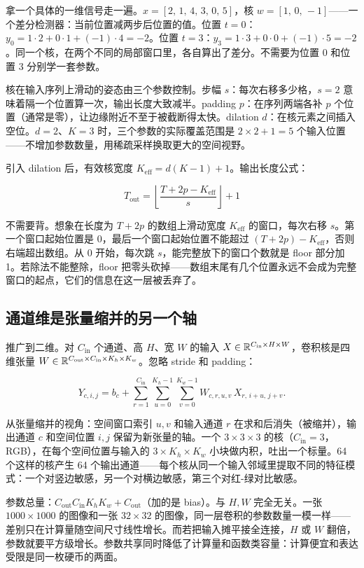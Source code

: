 拿一个具体的一维信号走一遍。\(x = [2,\,1,\,4,\,3,\,0,\,5]\)，核 \(w = [1,\,0,\,-1]\)——一个差分检测器：当前位置减两步后位置的值。位置 \(t=0\)：\(y_0 = 1\cdot 2 + 0\cdot 1 + (-1)\cdot 4 = -2\)。位置 \(t=3\)：\(y_3 = 1\cdot 3 + 0\cdot 0 + (-1)\cdot 5 = -2\)。同一个核，在两个不同的局部窗口里，各自算出了差分。不需要为位置 0 和位置 3 分别学一套参数。

核在输入序列上滑动的姿态由三个参数控制。步幅 \(s\)：每次右移多少格，\(s=2\) 意味着隔一个位置算一次，输出长度大致减半。padding \(p\)：在序列两端各补 \(p\) 个位置（通常是零），让边缘附近不至于被截断得太快。dilation \(d\)：在核元素之间插入空位。\(d=2\)、\(K=3\) 时，三个参数的实际覆盖范围是 \(2\times 2+1=5\) 个输入位置——不增加参数数量，用稀疏采样换取更大的空间视野。

引入 dilation 后，有效核宽度 \(K_{\mathrm{eff}} = d(K-1)+1\)。输出长度公式：

\[
T_{\mathrm{out}} = \left\lfloor\frac{T + 2p - K_{\mathrm{eff}}}{s}\right\rfloor + 1
\]

不需要背。想象在长度为 \(T+2p\) 的数组上滑动宽度 \(K_{\mathrm{eff}}\) 的窗口，每次右移 \(s\)。第一个窗口起始位置是 0，最后一个窗口起始位置不能超过 \((T+2p)-K_{\mathrm{eff}}\)，否则右端超出数组。从 0 开始，每次跳 \(s\)，能完整放下的窗口个数就是 floor 部分加 1。若除法不能整除，floor 把零头砍掉——数组末尾有几个位置永远不会成为完整窗口的起点，它们的信息在这一层被丢弃了。

\subsection{通道维是张量缩并的另一个轴}

推广到二维。对 \(C_{\mathrm{in}}\) 个通道、高 \(H\)、宽 \(W\) 的输入 \(X\in\mathbb{R}^{C_{\mathrm{in}}\times H\times W}\)，卷积核是四维张量 \(W\in\mathbb{R}^{C_{\mathrm{out}}\times C_{\mathrm{in}}\times K_h\times K_w}\)。忽略 stride 和 padding：

\[
Y_{c,i,j} = b_c + \sum_{r=1}^{C_{\mathrm{in}}}\sum_{u=0}^{K_h-1}\sum_{v=0}^{K_w-1} W_{c,r,u,v}\, X_{r,\,i+u,\,j+v}.
\]

从张量缩并的视角：空间窗口索引 \(u,v\) 和输入通道 \(r\) 在求和后消失（被缩并），输出通道 \(c\) 和空间位置 \(i,j\) 保留为新张量的轴。一个 \(3\times3\times 3\) 的核（\(C_{\mathrm{in}}=3\)，RGB），在每个空间位置与输入的 \(3\times K_h\times K_w\) 小块做内积，吐出一个标量。64 个这样的核产生 64 个输出通道——每个核从同一个输入邻域里提取不同的特征模式：一个对竖边敏感，另一个对横边敏感，第三个对红-绿对比敏感。

参数总量：\(C_{\mathrm{out}}C_{\mathrm{in}}K_hK_w + C_{\mathrm{out}}\)（加的是 bias）。与 \(H,W\) 完全无关。一张 \(1000\times 1000\) 的图像和一张 \(32\times 32\) 的图像，同一层卷积的参数数量一模一样——差别只在计算量随空间尺寸线性增长。而若把输入摊平接全连接，\(H\) 或 \(W\) 翻倍，参数就要平方级增长。参数共享同时降低了计算量和函数类容量：计算便宜和表达受限是同一枚硬币的两面。

